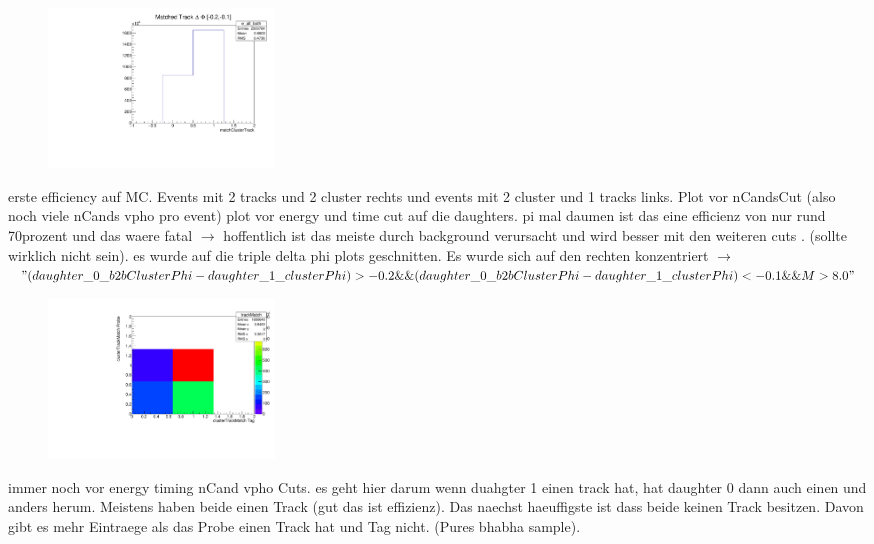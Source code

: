 \documentclass[10pt]{beamer}
\begin{document}
{\begin{frame}
\end{frame}

\begin{frame}

	\begin{figure}
		\includegraphics[width=6cm]{Collection/firstEffMC8NoEE}
	\end{figure}

erste efficiency auf MC. Events mit 2 tracks und 2 cluster rechts und events mit 2 cluster und 1 tracks links. Plot vor nCandsCut (also noch viele nCands vpho pro event) plot vor energy und time cut auf die daughters. pi mal daumen ist das eine efficienz von nur rund 70prozent und das waere fatal $\rightarrow$ hoffentlich ist das meiste durch background verursacht und wird besser mit den weiteren cuts . (sollte wirklich nicht sein). es wurde auf die triple delta phi plots geschnitten. Es wurde sich auf den rechten konzentriert $\rightarrow$ $"( daughter\_0\_b2bClusterPhi - daughter\_1\_clusterPhi) > -0.2 \&\& (daughter\_0\_b2bClusterPhi - daughter\_1\_clusterPhi) < -0.1 \&\& M>8.0"$


\end{frame}

\begin{frame}

\begin{figure}
	\includegraphics[width=6cm]{Collection/MCtrackMatch8}
\end{figure}
immer noch vor energy timing nCand vpho Cuts. es geht hier darum wenn duahgter 1 einen track hat, hat daughter 0 dann auch einen und anders herum. Meistens haben beide einen Track (gut das ist effizienz). Das naechst haeuffigste ist dass beide keinen Track besitzen. Davon gibt es mehr Eintraege als das Probe einen Track hat und Tag nicht. (Pures bhabha sample).



\end{frame}}
\end{document}
